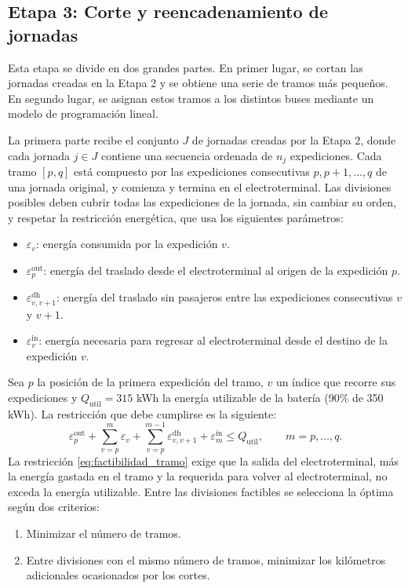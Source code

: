 \subsection{Etapa 3: Corte y reencadenamiento de jornadas}
\label{sec:etapa3}

Esta etapa se divide en dos grandes partes. En primer lugar, se cortan las jornadas creadas en la Etapa 2 y se obtiene una serie de tramos más pequeños. En segundo lugar, se asignan estos tramos a los distintos buses mediante un modelo de programación lineal.

La primera parte recibe el conjunto $J$ de jornadas creadas por la Etapa 2, donde cada jornada $j \in J$ contiene una secuencia ordenada de $n_j$ expediciones. Cada tramo $[p,q]$ está compuesto por las expediciones consecutivas $p,p+1,\ldots,q$ de una jornada original, y comienza y termina en el electroterminal. Las divisiones posibles deben cubrir todas las expediciones de la jornada, sin cambiar su orden, y respetar la restricción energética, que usa los siguientes parámetros:
\begin{itemize}
    \item $\varepsilon_v$: energía consumida
    por la expedición $v$.
    \item $\varepsilon^{\mathrm{out}}_p$: energía
    del traslado desde el electroterminal al origen
    de la expedición $p$.
    \item $\varepsilon^{\mathrm{dh}}_{v,v+1}$:
    energía del traslado sin pasajeros entre las expediciones
    consecutivas $v$ y $v+1$.
    \item $\varepsilon^{\mathrm{in}}_v$: energía
    necesaria para regresar al electroterminal
    desde el destino de la expedición $v$.
\end{itemize}
Sea $p$ la posición de la primera expedición del tramo, $v$ un índice que recorre sus expediciones y $Q_{\mathrm{util}} = 315$ kWh la energía utilizable de la batería (90\% de 350 kWh). La restricción que debe cumplirse es la siguiente:
\begin{equation}
\varepsilon^{\mathrm{out}}_p
+
\sum_{v=p}^{m}\varepsilon_v
+
\sum_{v=p}^{m-1}\varepsilon^{\mathrm{dh}}_{v,v+1}
+
\varepsilon^{\mathrm{in}}_m
\leq Q_{\mathrm{util}},
\qquad m=p,\ldots,q.
\label{eq:factibilidad_tramo}
\end{equation}
La restricción \eqref{eq:factibilidad_tramo} exige que la salida del electroterminal, más la energía gastada en el tramo y la requerida para volver al electroterminal, no exceda la energía utilizable. Entre las divisiones factibles se selecciona la óptima según dos criterios:
\begin{enumerate}
    \item Minimizar el número de tramos.
    \item Entre divisiones con el mismo número de
    tramos, minimizar los kilómetros adicionales
    ocasionados por los cortes.
\end{enumerate}

